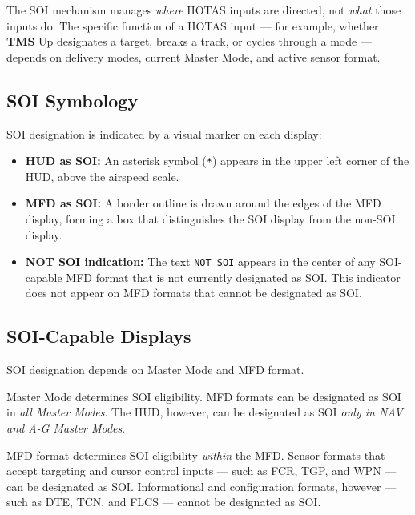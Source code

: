 \documentclass[11pt, a4paper, twoside]{report}
\begin{document}
The SOI mechanism manages \textit{where} HOTAS inputs are directed, not \textit{what} those inputs do. The specific function of a HOTAS input --- for example, whether \textbf{TMS} Up designates a target, breaks a track, or cycles through a mode --- depends on delivery modes, current Master Mode, and active sensor format.

\subsection{SOI Symbology}
\label{sec:C2-S1-S2}

SOI designation is indicated by a visual marker on each display:

\begin{itemize}
	\item \textbf{HUD as SOI:} An asterisk symbol (\texttt{*}) appears in the upper left corner of the HUD, above the airspeed scale.
	\item \textbf{MFD as SOI:} A border outline is drawn around the edges of the MFD display, forming a box that distinguishes the SOI display from the non-SOI display.
	\item \textbf{NOT SOI indication:} The text \texttt{NOT SOI} appears in the center of any SOI-capable MFD format that is not currently designated as SOI. This indicator does not appear on MFD formats that cannot be designated as SOI.
\end{itemize}

\subsection{SOI-Capable Displays}
\label{sec:C2-S1-S3}

SOI designation depends on Master Mode and MFD format.

Master Mode determines SOI eligibility. MFD formats can be designated as SOI in \textit{all Master Modes}. The HUD, however, can be designated as SOI \textit{only in NAV and A-G Master Modes}.

MFD format determines SOI eligibility \textit{within} the MFD. Sensor formats that accept targeting and cursor control inputs --- such as FCR, TGP, and WPN --- can be designated as SOI. Informational and configuration formats, however --- such as DTE, TCN, and FLCS --- cannot be designated as SOI.
\end{document}
